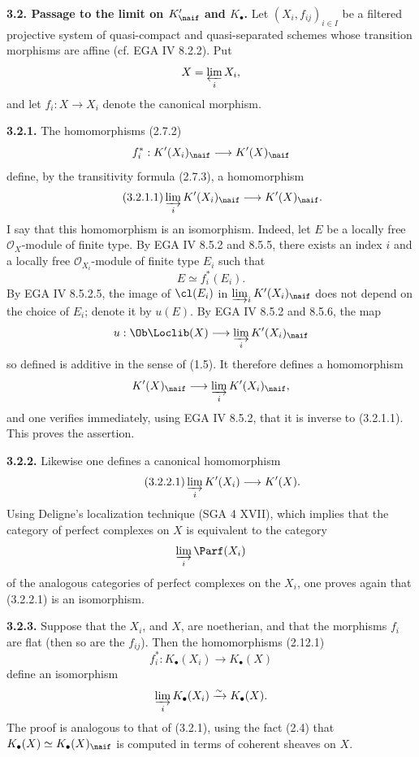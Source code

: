 \textbf{3.2. Passage to the limit on \(K'_{\naif}\) and \(K_{\bullet}\).} Let \((X_i,f_{ij})_{i\in I}\) be a filtered projective system of quasi-compact and quasi-separated schemes whose transition morphisms are affine (cf. EGA IV 8.2.2). Put
\[
 X=\varprojlim_i X_i,
\]
and let \(f_i:X\to X_i\) denote the canonical morphism.

\textbf{3.2.1.} The homomorphisms (2.7.2)
\[
 f_i^*:K'(X_i)_{\naif}\longrightarrow K'(X)_{\naif}
\]
define, by the transitivity formula (2.7.3), a homomorphism
\begin{equation}\tag{3.2.1.1}
 \varinjlim_i K'(X_i)_{\naif}\longrightarrow K'(X)_{\naif}.
\end{equation}
I say that this homomorphism is an isomorphism. Indeed, let \(E\) be a locally free \(\mathcal O_X\)-module of finite type. By EGA IV 8.5.2 and 8.5.5, there exists an index \(i\) and a locally free \(\mathcal O_{X_i}\)-module of finite type \(E_i\) such that
\[
 E\simeq f_i^*(E_i).
\]
By EGA IV 8.5.2.5, the image of \(\cl(E_i)\) in \(\varinjlim_i K'(X_i)_{\naif}\) does not depend on the choice of \(E_i\); denote it by \(u(E)\). By EGA IV 8.5.2 and 8.5.6, the map
\[
 u:\Ob\Loclib(X)\longrightarrow \varinjlim_i K'(X_i)_{\naif}
\]
so defined is additive in the sense of (1.5). It therefore defines a homomorphism
\[
 K'(X)_{\naif}\longrightarrow \varinjlim_i K'(X_i)_{\naif},
\]
and one verifies immediately, using EGA IV 8.5.2, that it is inverse to (3.2.1.1). This proves the assertion.

\textbf{3.2.2.} Likewise one defines a canonical homomorphism
\begin{equation}\tag{3.2.2.1}
 \varinjlim_i K'(X_i)\longrightarrow K'(X).
\end{equation}
Using Deligne's localization technique (SGA 4 XVII), which implies that the category of perfect complexes on \(X\) is equivalent to the category
\[
 \varinjlim_i \Parf(X_i)
\]
of the analogous categories of perfect complexes on the \(X_i\), one proves again that (3.2.2.1) is an isomorphism.

\textbf{3.2.3.} Suppose that the \(X_i\), and \(X\), are noetherian, and that the morphisms \(f_i\) are flat (then so are the \(f_{ij}\)). Then the homomorphisms (2.12.1)
\[
 f_i^*:K_{\bullet}(X_i)\longrightarrow K_{\bullet}(X)
\]
define an isomorphism
\[
 \varinjlim_i K_{\bullet}(X_i)\xrightarrow{\sim}K_{\bullet}(X).
\]
The proof is analogous to that of (3.2.1), using the fact (2.4) that \(K_{\bullet}(X)\simeq K_{\bullet}(X)_{\naif}\) is computed in terms of coherent sheaves on \(X\).

